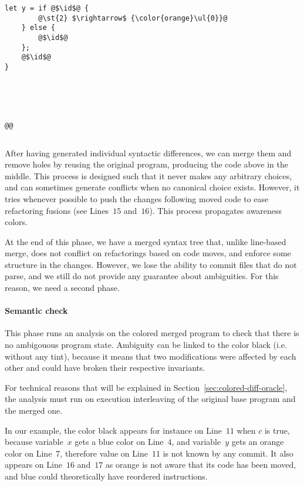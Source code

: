 \documentclass[a4paper,11pt]{article}
\newcommand\id{\square}
\begin{document}
\begin{minipage}{\textwidth}
\begin{minipage}{.32\textwidth}
\begin{lstlisting}[rulecolor=\color{orange!30}]
    let y = if @$\id$@ {
        @\st{2} $\rightarrow$ {\color{orange}\ul{0}}@
    } else {
        @$\id$@
    };
    @$\id$@
}





@@
\end{lstlisting}
\end{minipage}\hfill
\vspace{-.4cm}
\begin{lstlisting}[label=lst:overview_diffs, caption={Left (resp. right) represent the difference between original source code and blue commit (resp. orange commit). Center is the syntactic fusion of these two differences.}]
\end{lstlisting}
\end{minipage}

After having generated individual syntactic differences, we can merge
them and remove holes by reusing the original program, producing the
code above in the middle. This process is designed such that it never
makes any arbitrary choices, and can sometimes generate conflicts when
no canonical choice exists. However, it tries whenever possible to
push the changes following moved code to ease refactoring fusions (see Lines~$15$ and~$16$). This process propagates awareness colors.

At the end of this phase, we have a merged syntax tree that, unlike line-based merge, does not conflict on refactorings based on code moves, and enforce some structure in the changes. However, we lose the ability to commit files that do not parse, and we still do not provide any guarantee about ambiguities. For this reason, we need a second phase.

\paragraph{Semantic check}
This phase runs an analysis on the colored merged program to check that there is no ambigouous program state. Ambiguity can be linked to the color black (i.e. without any tint), because it means that two modifications were affected by each other and could have broken their respective invariants.

For technical reasons that will be explained in Section~\ref{sec:colored-diff-oracle}, the analysis must run on execution interleaving of the original base program and the merged one.

In our example, the color black appears for instance on Line~$11$ when $c$ is true, because variable~$x$ gets a blue color on Line~$4$, and variable~$y$ gets an orange color on Line~$7$, therefore value on
Line~$11$ is not known by any commit. It also appears on Line~$16$
and~$17$ as orange is not aware that its code has been moved, and blue could theoretically have reordered instructions.
\end{document}
